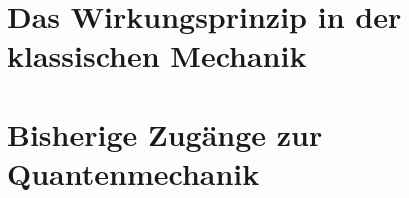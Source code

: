 \section{Das Wirkungsprinzip in der klassischen Mechanik }





\section{Bisherige Zugänge zur Quantenmechanik}